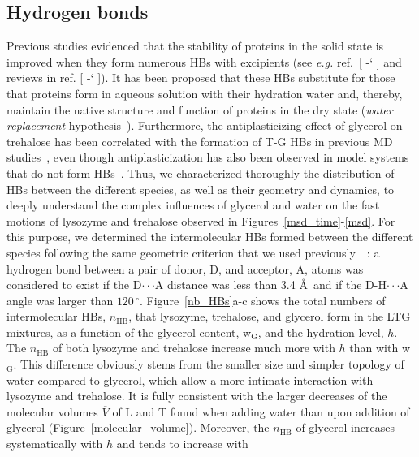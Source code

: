 \documentclass[journal=jpcbfk,manuscript=article]{achemso}
\newcommand*{\citen}[1]{%
\begingroup
\romannumeral-`\x %
\setcitestyle{numbers}%
\cite{#1}%
\endgroup   
}
\begin{document}
\begin{singlespacing}
\newpage

\subsection{Hydrogen bonds}

Previous studies evidenced that the stability of proteins in the solid state is improved
when they form numerous HBs with excipients (see \textit{e.g.} ref.~[\citen{Allison1999}] and reviews in 
ref. [\citen{Wang2000,Manning2010,Ohtake2011}]). It has been proposed that these HBs substitute for
those that proteins form in aqueous solution with their hydration water and, thereby, maintain the native 
structure and function of proteins in the dry state (\textit{water replacement} hypothesis~\cite{Crowe1984b}).
Furthermore, the antiplasticizing effect of glycerol on trehalose has been correlated with the formation 
of T-G HBs in previous MD studies~\cite{Dirama2005,Curtis2006}, even though antiplasticization has also 
been observed in model systems that do not form HBs~\cite{Simmons2011}. Thus, we characterized thoroughly 
the distribution of HBs between the different species, as well as their geometry and dynamics, to deeply understand the complex 
influences of glycerol and water on the fast motions of lysozyme and trehalose observed in Figures~\ref{msd_time}-\ref{msd}. 
For this purpose, we 
determined the intermolecular HBs formed between the different species following the same geometric 
criterion that we used previously~\cite{Lerbret2007,Lerbret2012}~: a hydrogen bond between a pair of 
donor, D, and acceptor, A, atoms was considered to exist if the D$\cdot\cdot\cdot$A distance was less than 
3.4 \AA \ and if the D-H$\cdot\cdot\cdot$A angle was larger than $120\,^{\circ}$. 
Figure~\ref{nb_HBs}a-c shows the total numbers of intermolecular HBs, $n_{\textrm{HB}}$, that lysozyme, trehalose, and 
glycerol form in the LTG mixtures, as a function of the glycerol content, w$_{\textrm{G}}$, and the hydration level, $h$. 
The $n_{\textrm{HB}}$ of both lysozyme and trehalose increase much more with $h$ than with w$_{\textrm{G}}$.
This difference obviously stems from the smaller size and simpler topology of water compared to glycerol, which 
allow a more intimate interaction with lysozyme and trehalose. It is fully consistent with the larger decreases
of the molecular volumes $\overline{V}$ of L and T found when adding water than upon addition of glycerol (Figure~\ref{molecular_volume}). 
Moreover, the $n_{\textrm{HB}}$ of glycerol increases systematically with $h$ and tends to increase with 

\end{singlespacing}
\end{document}
